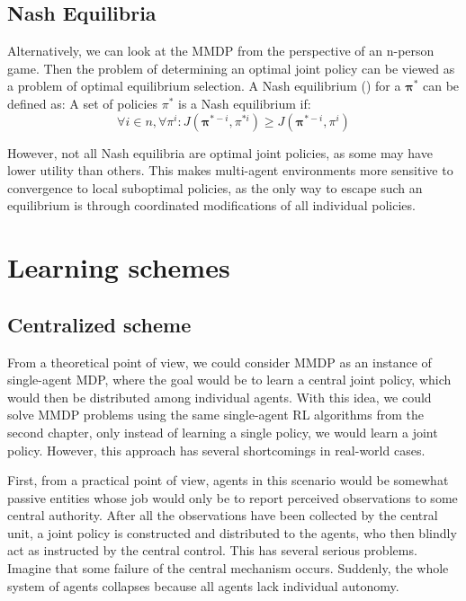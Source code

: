 \subsection{Nash Equilibria}
Alternatively, we can look at the MMDP from the perspective of an n-person game. 
Then the problem of determining an optimal joint policy can be viewed as a problem of optimal equilibrium selection.
A Nash equilibrium (\cite{NASH}) for a $\boldsymbol{\pi}^*$ can be defined as:\linebreak
A set of policies $\pi^*$ is a Nash equilibrium if:
\[
    \forall i \in n, \forall \pi^i: J(\boldsymbol{\pi}^{*-i}, \pi^{*i}) \ge J(\boldsymbol{\pi}^{*-i}, \pi^i)
\]

However, not all Nash equilibria are optimal joint policies, as some may have lower utility than others.
This makes multi-agent environments more sensitive to convergence to local suboptimal policies, as the only way to escape such an equilibrium is through coordinated modifications of all individual policies.



\section{Learning schemes}
\subsection*{Centralized scheme}\label{CentralScheme}
From a theoretical point of view, we could consider MMDP as an instance of single-agent MDP, where the goal would be to learn a central joint policy, which would then be distributed among individual agents.
With this idea, we could solve MMDP problems using the same single-agent RL algorithms from the second chapter, only instead of learning a single policy, we would learn a joint policy.
However, this approach has several shortcomings in real-world cases.

First, from a practical point of view, agents in this scenario would be somewhat passive entities whose job would only be to report perceived observations to some central authority.
After all the observations have been collected by the central unit, a joint policy is constructed and distributed to the agents, who then blindly act as instructed by the central control.
This has several serious problems.
Imagine that some failure of the central mechanism occurs.
Suddenly, the whole system of agents collapses because all agents lack individual autonomy.

